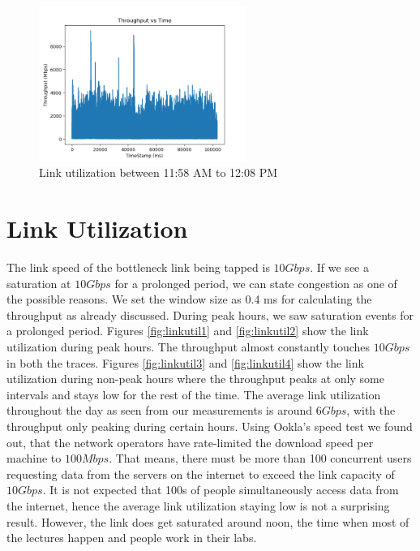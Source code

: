 \begin{figure}[t]
         \centering
         \includegraphics[width=0.6\textwidth]{Figures/link_util_11_29.png}
         \caption[Link utilization between 11:58 AM to 12:08 PM]{Link utilization between 11:58 AM to 12:08 PM}
         \label{fig:lu}
\end{figure}

\section{Link Utilization}
The link speed of the bottleneck link being tapped is $10Gbps$. If we see a saturation at $10Gbps$ for a prolonged period, we can state congestion as one of the possible reasons. We set the window size as 0.4 ms for calculating the throughput as already discussed. During peak hours, we saw saturation events for a prolonged period. Figures \ref{fig:linkutil1} and \ref{fig:linkutil2} show the link utilization during peak hours. The throughput almost constantly touches $10Gbps$ in both the traces. Figures \ref{fig:linkutil3} and \ref{fig:linkutil4} show the link utilization during non-peak hours where the throughput peaks at only some intervals and stays low for the rest of the time. The average link utilization throughout the day as seen from our measurements is around $6Gbps$, with the throughput only peaking during certain hours. Using Ookla's speed test we found out, that the network operators have rate-limited the download speed per machine to $100Mbps$. That means, there must be more than 100 concurrent users requesting data from the servers on the internet to exceed the link capacity of $10Gbps$. It is not expected that 100s of people simultaneously access data from the internet, hence the average link utilization staying low is not a surprising result. However, the link does get saturated around noon, the time when most of the lectures happen and people work in their labs.

